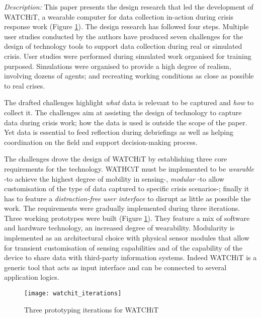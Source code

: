 \emph{Description:} This paper presents the design research that led the
development of WATCHiT, a wearable computer for data collection
in-action during crisis response work (Figure
\ref{fig:watchit-prototypes}). The design research has followed four
steps. Multiple user studies conducted by the authors have produced
seven challenges for the design of technology tools to support data
collection during real or simulated crisis.
User studies were performed during simulated work organised for training
purposed. Simulations were organised to provide a high degree of
realism, involving dozens of agents; and recreating working conditions
as close as possible to real crises.

The drafted challenges highlight \emph{what} data is relevant to be
captured and \emph{how} to collect it. The challenges aim at assisting
the design of technology to capture data during crisis work; how the
data is used is outside the scope of the paper. Yet data is essential to
feed reflection during debriefings as well as helping coordination on
the field and support decision-making process.

The challenges drove the design of WATCHiT by establishing three core
requirements for the technology. WATHCiT must be implemented to be
\emph{wearable} -to achieve the highest degree of mobility in sensing-,
\emph{modular} -to allow customisation of the type of data captured to
specific crisis scenarios-; finally it has to feature a
\emph{distraction-free user interface} to disrupt as little as possible
the work. The requirements were gradually implemented during three
iterations. Three working prototypes were built (Figure
\ref{fig:watchit-prototypes}). They feature a mix of software and
hardware technology, an increased degree of wearability. Modularity is
implemented as an architectural choice with physical sensor modules that
allow for transient customisation of sensing capabilities and of the
capability of the device to share data with third-party information
systems. Indeed WATCHiT is a generic tool that acts as input interface
and can be connected to several application logics.

\begin{figure}[tbh]
    \centering
    \texttt{[image: watchit\_iterations]}
    \caption{Three prototyping iterations for WATCHiT}
    \label{fig:watchit-prototypes}
\end{figure}

